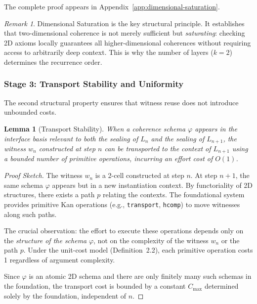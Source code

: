 \documentclass[11pt]{article}
\newtheorem{lemma}[theorem]{Lemma}
\theoremstyle{definition}
\theoremstyle{remark}
\newtheorem{remark}[theorem]{Remark}
\begin{document}
The complete proof appears in Appendix~\ref{app:dimensional-saturation}.

\begin{remark}
Dimensional Saturation is the key structural principle. It establishes that two-dimensional coherence
is not merely sufficient but \emph{saturating}: checking 2D axioms locally guarantees all higher-dimensional
coherences without requiring access to arbitrarily deep context. This is why the number of layers
($k=2$) determines the recurrence order.
\end{remark}

\subsubsection{Stage 3: Transport Stability and Uniformity}

The second structural property ensures that witness reuse does not introduce unbounded costs.

\begin{lemma}[Transport Stability]
\label{lem:transport-stability}
When a coherence schema $\varphi$ appears in the interface basis relevant to both the sealing of $L_n$
and the sealing of $L_{n+1}$, the witness $w_n$ constructed at step $n$ can be transported to the
context of $L_{n+1}$ using a bounded number of primitive operations, incurring an effort cost of $O(1)$.
\end{lemma}

\begin{proof}[Proof Sketch]
The witness $w_n$ is a 2-cell constructed at step $n$. At step $n+1$, the same schema $\varphi$ appears
but in a new instantiation context. By functoriality of 2D structures, there exists a path $p$ relating
the contexts. The foundational system provides primitive Kan operations (e.g., \texttt{transport},
\texttt{hcomp}) to move witnesses along such paths.

The crucial observation: the effort to execute these operations depends only on the \emph{structure of
the schema} $\varphi$, not on the complexity of the witness $w_n$ or the path $p$. Under the unit-cost
model (Definition~2.2), each primitive operation costs 1 regardless of argument complexity.

Since $\varphi$ is an atomic 2D schema and there are only finitely many such schemas in the foundation,
the transport cost is bounded by a constant $C_{\max}$ determined solely by the foundation, independent
of $n$.
\end{proof}
\end{document}
